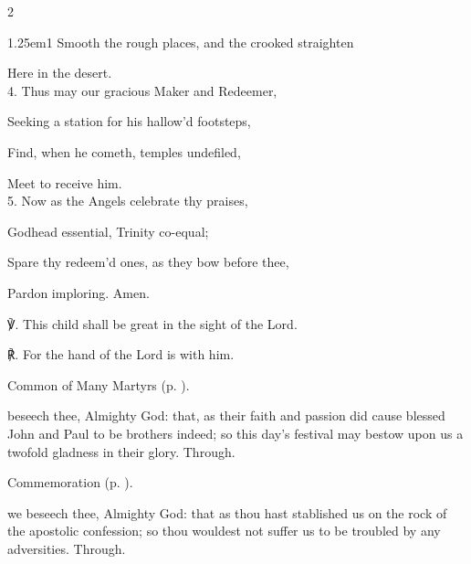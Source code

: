 \begin{paracol}{2}
\begin{hangparas}{1.25em}{1}
Smooth the rough places, and the crooked straighten

Here in the desert.\\

4. Thus may our gracious Maker and Redeemer,

Seeking a station for his hallow'd footsteps,

Find, when he cometh, temples undefiled,

Meet to receive him.\\

5. Now as the Angels celebrate thy praises,

Godhead essential, Trinity co-equal;

Spare thy redeem'd ones, as they bow before thee,

Pardon imploring. Amen.\\
\end{hangparas}

℣. This child shall be great in the sight of the Lord.

℟. For the hand of the Lord is with him.



\fussy
\end{paracol}


\clearpage
{}

\begin{rubric}
	Common of Many Martyrs (p. \pageref{CommonMartyrs}).
\end{rubric}

{} beseech thee, Almighty God: that, as their faith and passion did cause blessed John and Paul to be brothers indeed; so this day's festival may bestow upon us a twofold gladness in their glory. Through.

\begin{rubric}
	Commemoration  (p. \pageref{JohnBaptistCollect}).
\end{rubric}



{} we beseech thee, Almighty God: that as thou hast stablished us on the rock of the apostolic confession; so thou wouldest not suffer us to be troubled by any adversities. Through.


